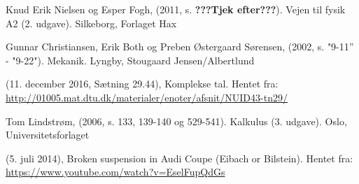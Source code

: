 \begin{thebibliography}{9}


 
  Knud Erik Nielsen og Esper Fogh,
  (2011, s. \textbf{???Tjek efter???}). 
  Vejen til fysik A2 (2. udgave). 
  Silkeborg,
  Forlaget Hax

  Gunnar Christiansen, Erik Both og Preben Østergaard Sørensen,
  (2002, s. "9-11'' - "9-22"). 
  Mekanik. 
  Lyngby,
  Stougaard Jensen/Albertlund
  
(11. december 2016, Sætning 29.44), Komplekse tal. Hentet fra:
\url{http://01005.mat.dtu.dk/materialer/enoter/afsnit/NUID43-tn29/}

  Tom Lindstrøm,
  (2006, s. 133, 139-140 og 529-541). 
  Kalkulus (3. udgave). 
  Oslo,
  Universitetsforlaget
 
 (5. juli 2014), Broken suspension in Audi Coupe (Eibach or Bilstein). Hentet fra:
 \url{https://www.youtube.com/watch?v=EselFupQdGs}
  
\end{thebibliography}